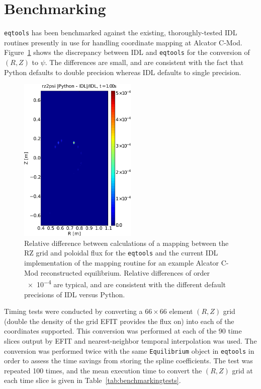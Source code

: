 \documentclass[12pt,floatfix,showpacs]{revtex4-1}
\newcommand{\eqtools}{\texttt{eqtools}\xspace}
\begin{document}
\section{Benchmarking}\label{sec:benchmark}
\eqtools has been benchmarked against the existing, thoroughly-tested IDL routines presently in use for handling coordinate mapping at Alcator C-Mod.
Figure~\ref{fig:rz2psi_diff} shows the discrepancy between IDL and \eqtools for the conversion of $(R, Z)$ to $\psi$.
The differences are small, and are consistent with the fact that Python defaults to double precision whereas IDL defaults to single precision.
\begin{figure}
	\includegraphics[width=0.5\textwidth]{graphics/rz2psi}
	\caption{Relative difference between calculations of a mapping between the RZ grid and poloidal flux for the \eqtools and the current IDL implementation of the mapping routine for an example Alcator C-Mod reconstructed equilibrium.  Relative differences of order \num{e-4} are typical, and are consistent with the different default precisions of IDL versus Python.}
	\label{fig:rz2psi_diff}
\end{figure}
Timing tests were conducted by converting a $66\times66$ element $(R, Z)$ grid (double the density of the grid EFIT provides the flux on) into each of the coordinates supported.
This conversion was performed at each of the 90 time slices output by EFIT and nearest-neighbor temporal interpolation was used.
The conversion was performed twice with the same \verb|Equilibrium| object in \eqtools in order to assess the time savings from storing the spline coefficients.
The test was repeated 100 times, and the mean execution time to convert the $(R, Z)$ grid at each time slice is given in Table~\ref{tab:benchmarkingtests}.
\end{document}
